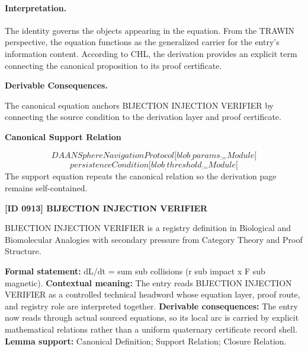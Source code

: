 \paragraph{Interpretation.}
The identity governs the objects appearing in the equation. From the TRAWIN perspective, the equation functions as the generalized carrier for the entry’s information content. According to CHL, the derivation provides an explicit term connecting the canonical proposition to its proof certificate.

\par\vspace{0.35em}
\noindent\textbf{Derivable Consequences.}\quad
\begingroup
\footnotesize
\raggedright
The canonical equation anchors BIJECTION INJECTION VERIFIER by connecting the source condition to the derivation layer and proof certificate.
\par\endgroup

\noindent\textbf{Canonical Support Relation}\par
\[
DAANSphereNavigationProtocol[blob_, params_ := Module[
\]
\[
persistenceCondition[blob_, threshold_ := Module[
\]
\noindent The support equation repeats the canonical relation so the derivation page remains self-contained.\par

\clearpage
\noindent\textbf{[ID 0913] BIJECTION INJECTION VERIFIER}\par
\vspace{0.35em}
\begingroup\small
{}
BIJECTION INJECTION VERIFIER is a registry definition in Biological and Biomolecular Analogies with secondary pressure from Category Theory and Proof Structure.

\begingroup\footnotesize\setlength{\emergencystretch}{3em}\sloppy
\textbf{Formal statement:} dL/dt = sum sub collisions (r sub impact x F sub magnetic). \textbf{Contextual meaning:} The entry reads BIJECTION INJECTION VERIFIER as a controlled technical headword whose equation layer, proof route, and registry role are interpreted together. \textbf{Derivable consequences:} The entry now reads through actual sourced equations, so its local arc is carried by explicit mathematical relations rather than a uniform quaternary certificate record shell. \textbf{Lemma support:} Canonical Definition; Support Relation; Closure Relation.\par
\endgroup

